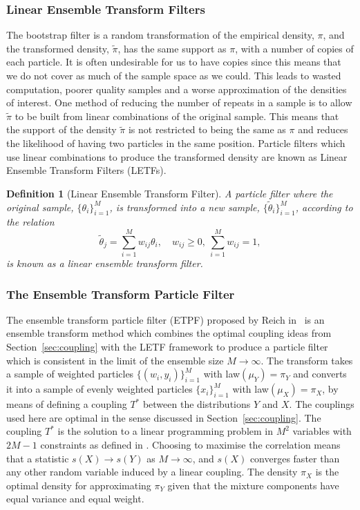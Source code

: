 \documentclass[final]{siamltex}
\newtheorem{dfn}{Definition}[section]
\begin{document}

\subsubsection{Linear Ensemble Transform Filters}

The bootstrap filter is a random transformation of the empirical density, $\pi$, and the transformed
density, $\tilde{\pi}$, has the same support as $\pi$, with a number of copies of each
particle. It is often undesirable for us to have copies since this means that we do not cover as
much of the sample space as we could. This leads to wasted computation, poorer quality samples and a
worse approximation of the densities of interest. One method of reducing the number of repeats in a
sample is to allow $\tilde{\pi}$ to be built from linear combinations of the original sample. This
means that the support of the density $\tilde{\pi}$ is not restricted to being the same as $\pi$ and
reduces the likelihood of having two particles in the same position. Particle filters which use
linear combinations to produce the transformed density are known as Linear Ensemble Transform
Filters (LETFs).

\begin{dfn}[Linear Ensemble Transform Filter]\label{def:LETF}
A particle filter where the original sample, $\{\theta_i\}_{i=1}^M$, is transformed into a new
sample, $\{\tilde{\theta}_i\}_{i=1}^M$, according to the relation
\[
	\tilde{\theta}_j = \sum\limits_{i=1}^M \! w_{ij}\theta_i, \quad w_{ij} \geq 0, \ \sum\limits_{i=1}^M
		w_{ij} = 1,
\]
is known as a linear ensemble transform filter.
\end{dfn}


\subsubsection{The Ensemble Transform Particle Filter}

The ensemble transform particle filter (ETPF) proposed by Reich in~\cite{reich2013nonparametric} is
an ensemble transform method which combines the optimal coupling ideas from
Section~\ref{sec:coupling} with the LETF framework to produce a particle filter which is consistent
in the limit of the ensemble size $M\rightarrow\infty$. The transform takes a sample of weighted
particles $\{(w_i,y_i)\}_{i=1}^M$ with law$(\mu_Y) = \pi_{Y}$ and converts it into a sample of
evenly weighted particles $\{x_i\}_{i=1}^M$ with law$(\mu_{X}) = \pi_{X}$, by means of defining a
coupling $T^*$ between the distributions $Y$ and $X$. The couplings used here are optimal in the
sense discussed in Section~\ref{sec:coupling}. The coupling $T^*$ is the solution to a linear
programming problem in $M^2$ variables with $2M-1$ constraints as defined in
\cite{reich2013nonparametric}. Choosing to maximise the correlation means that a statistic $s(X)
\rightarrow s(Y)$ as $M\rightarrow\infty$, and $s(X)$ converges faster than any other random
variable induced by a linear coupling. The density $\pi_X$ is the optimal density for approximating
$\pi_Y$ given that the mixture components have equal variance and equal weight.
\end{document}
